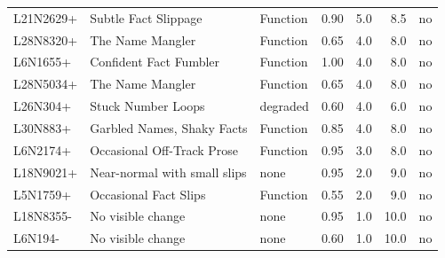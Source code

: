 {\begin{longtable}{@{}lL{3.4cm}L{1.8cm}rrrL{2.2cm}@{}}
L21N2629+ & Subtle Fact Slippage & Function & 0.90 & 5.0 & 8.5 & no \\
L28N8320+ & The Name Mangler & Function & 0.65 & 4.0 & 8.0 & no \\
L6N1655+ & Confident Fact Fumbler & Function & 1.00 & 4.0 & 8.0 & no \\
L28N5034+ & The Name Mangler & Function & 0.65 & 4.0 & 8.0 & no \\
L26N304+ & Stuck Number Loops & degraded & 0.60 & 4.0 & 6.0 & no \\
L30N883+ & Garbled Names, Shaky Facts & Function & 0.85 & 4.0 & 8.0 & no \\
L6N2174+ & Occasional Off-Track Prose & Function & 0.95 & 3.0 & 8.0 & no \\
L18N9021+ & Near-normal with small slips & none & 0.95 & 2.0 & 9.0 & no \\
L5N1759+ & Occasional Fact Slips & Function & 0.55 & 2.0 & 9.0 & no \\
L18N8355- & No visible change & none & 0.95 & 1.0 & 10.0 & no \\
L6N194- & No visible change & none & 0.60 & 1.0 & 10.0 & no \\
\end{longtable}}
